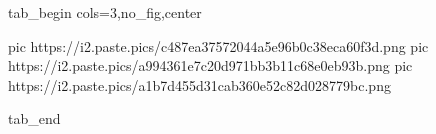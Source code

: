  
 
 
 
 


\ifcmt
  tab_begin cols=3,no_fig,center

     pic https://i2.paste.pics/c487ea37572044a5e96b0c38eca60f3d.png
		 pic https://i2.paste.pics/a994361e7c20d971bb3b11c68e0eb93b.png
		 pic https://i2.paste.pics/a1b7d455d31cab360e52c82d028779bc.png

  tab_end
\fi
